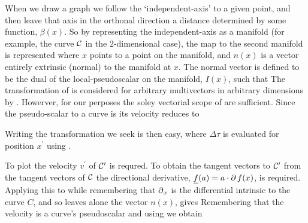 When we draw a graph we follow the `independent-axis' to a given point,
and then leave that axis in the orthonal direction a distance determined
by some function, $\beta(x)$.
So by representing the independent-axis as a manifold (for example, the curve
${\cal C}$ in the 2-dimensional case),
the map to the second manifold  is represented
where $x$ points to a point on the  manifold, and $n(x)$ is a vector entirely extrinsic (normal)
to the manifold at $x$. %
The normal vector is defined to be the dual of the local-pseudoscalar on
the manifold, $I(x)$, such that
The transformation of  is considered for arbitrary multivectors in
arbitrary dimensions by
\cite{Hestenes1984}.
Howerver, for our perposes the soley vectorial scope of
 are sufficient.
Since the pseudo-scalar to a curve is its velocity 
reduces to


Writing the transformation we seek is then easy,
where $\Delta \tau$ is evaluated for position $x^\prime$ using .

To plot  the velocity $v^\prime$ of ${\cal C}^\prime$ is
requred.
To obtain the tangent vectors to ${\cal C}^\prime$ from the tangent vectors
of ${\cal C}$ the  directional derivative,
$\underline{f}(a)= a\cdot\operatorname{\partial} f(x)$, is required.
Applying this to  while remembering that $\operatorname{\partial}_x$ is the differential intrinsic to the curve $C$,
and so leaves alone the vector $n(x)$, gives
Remembering that the velocity is a curve's pseudoscalar and using
 we obtain

